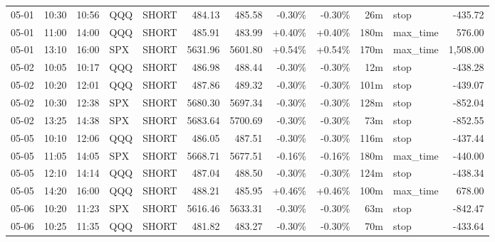 \documentclass[11pt,a4paper,twoside]{article}
\begin{document}
\begin{center}
\begin{longtable}{>{\color{txtmain}}l l l l l r r r r r >{\color{txtmain}}l r}
05-01 & 10:30 & 10:56 & QQQ & SHORT & 484.13 & 485.58 & \textcolor{lossred}{-0.30\%} & \textcolor{lossred}{-0.30\%} & 26m & stop & \textcolor{lossred}{-435.72} \\
05-01 & 11:00 & 14:00 & QQQ & SHORT & 485.91 & 483.99 & \textcolor{wingreen}{+0.40\%} & \textcolor{wingreen}{+0.40\%} & 180m & max\_time & \textcolor{wingreen}{576.00} \\
05-01 & 13:10 & 16:00 & SPX & SHORT & 5631.96 & 5601.80 & \textcolor{wingreen}{+0.54\%} & \textcolor{wingreen}{+0.54\%} & 170m & max\_time & \textcolor{wingreen}{1,508.00} \\
05-02 & 10:05 & 10:17 & QQQ & SHORT & 486.98 & 488.44 & \textcolor{lossred}{-0.30\%} & \textcolor{lossred}{-0.30\%} & 12m & stop & \textcolor{lossred}{-438.28} \\
05-02 & 10:20 & 12:01 & QQQ & SHORT & 487.86 & 489.32 & \textcolor{lossred}{-0.30\%} & \textcolor{lossred}{-0.30\%} & 101m & stop & \textcolor{lossred}{-439.07} \\
05-02 & 10:30 & 12:38 & SPX & SHORT & 5680.30 & 5697.34 & \textcolor{lossred}{-0.30\%} & \textcolor{lossred}{-0.30\%} & 128m & stop & \textcolor{lossred}{-852.04} \\
05-02 & 13:25 & 14:38 & SPX & SHORT & 5683.64 & 5700.69 & \textcolor{lossred}{-0.30\%} & \textcolor{lossred}{-0.30\%} & 73m & stop & \textcolor{lossred}{-852.55} \\
05-05 & 10:10 & 12:06 & QQQ & SHORT & 486.05 & 487.51 & \textcolor{lossred}{-0.30\%} & \textcolor{lossred}{-0.30\%} & 116m & stop & \textcolor{lossred}{-437.44} \\
05-05 & 11:05 & 14:05 & SPX & SHORT & 5668.71 & 5677.51 & \textcolor{lossred}{-0.16\%} & \textcolor{lossred}{-0.16\%} & 180m & max\_time & \textcolor{lossred}{-440.00} \\
05-05 & 12:10 & 14:14 & QQQ & SHORT & 487.04 & 488.50 & \textcolor{lossred}{-0.30\%} & \textcolor{lossred}{-0.30\%} & 124m & stop & \textcolor{lossred}{-438.34} \\
05-05 & 14:20 & 16:00 & QQQ & SHORT & 488.21 & 485.95 & \textcolor{wingreen}{+0.46\%} & \textcolor{wingreen}{+0.46\%} & 100m & max\_time & \textcolor{wingreen}{678.00} \\
05-06 & 10:20 & 11:23 & SPX & SHORT & 5616.46 & 5633.31 & \textcolor{lossred}{-0.30\%} & \textcolor{lossred}{-0.30\%} & 63m & stop & \textcolor{lossred}{-842.47} \\
05-06 & 10:25 & 11:35 & QQQ & SHORT & 481.82 & 483.27 & \textcolor{lossred}{-0.30\%} & \textcolor{lossred}{-0.30\%} & 70m & stop & \textcolor{lossred}{-433.64} \\

\end{longtable}
\end{center}
\end{document}
